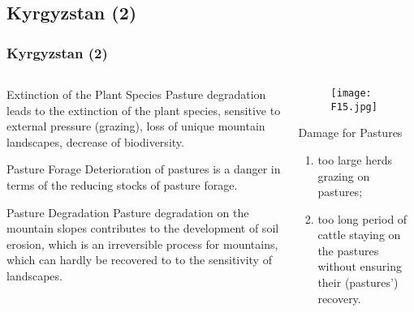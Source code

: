 \documentclass[pdflatex,compress,8pt,
	xcolor={dvipsnames,dvipsnames,svgnames,x11names,table},
	hyperref={colorlinks = true,
	breaklinks = true, 
	urlcolor = NavyBlue, 
	breaklinks = true}]{beamer}
\begin{document}
\subsection{Kyrgyzstan (2)}
\begin{frame}\frametitle{Kyrgyzstan (2)}

\begin{minipage}[0.4\textheight]{\textwidth}
\begin{columns}[T]
\begin{column}{0.5\textwidth}
\vspace{2em}

\begin{block}{Extinction of the Plant Species}
Pasture degradation leads to the extinction of the plant species, sensitive to external pressure (grazing), loss of unique mountain landscapes, decrease of biodiversity.
\end{block}

\begin{alertblock}{Pasture Forage}
Deterioration of pastures is a danger in terms of the reducing stocks of pasture forage.
\end{alertblock}

\begin{examples}{Pasture Degradation}
Pasture degradation on the mountain slopes contributes to the development of soil erosion, which is an irreversible process for mountains, which can hardly be recovered to to the sensitivity of landscapes.
\end{examples}

\end{column}
\begin{column}{0.5\textwidth}
\vspace{2em} 

\begin{figure}[H]
	\centering
		\texttt{[image: F15.jpg]}
\end{figure}

\begin{block}{Damage for Pastures}
\begin{enumerate}
	\item \alert{too large} herds grazing on pastures;
	\item \alert{too long} period of cattle staying on the pastures without ensuring their (pastures') recovery.
\end{enumerate}
\end{block}

\end{column}
\end{columns}
\end{minipage}

\end{frame}
\end{document}
